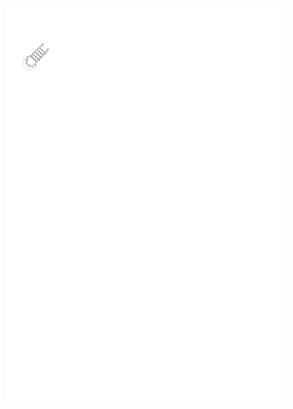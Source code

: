 \begin{figure}
\begin{subfigure}{\wi}
    \includegraphics[trim=1cm 24.5cm 17.5cm 2.5cm]{../img/alg/insert/1/circle-big}
  \end{subfigure}
  \begin{subfigure}{\wi}

\end{subfigure}
\end{figure}
